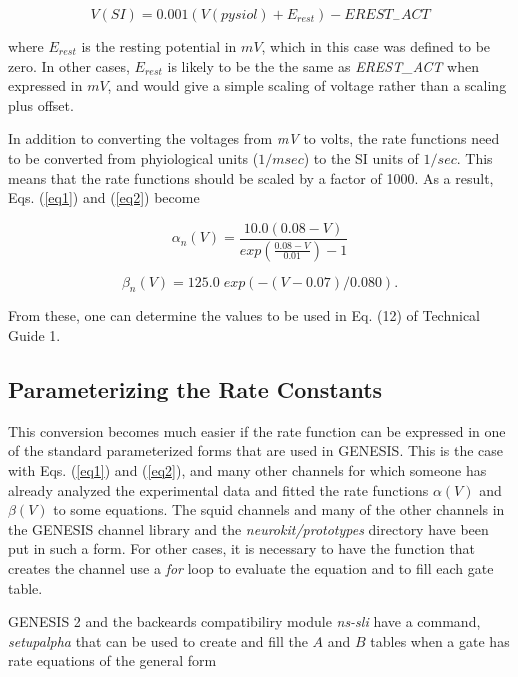 \documentclass[12pt]{article}
\begin{document}
\begin{equation}
V(SI) = 0.001 (V(pysiol) + E_{rest}) - EREST_{-}ACT
\label{eq6}
\end{equation}

where $E_{rest}$ is the resting potential in $mV$, which in this case
was defined to be zero.  In other cases, $E_{rest}$ is likely to be
the the same as {\em EREST\_ACT} when expressed in $mV$,  and would give a
simple scaling of voltage rather than a scaling plus offset.

In addition to converting the voltages from {\em mV\/} to volts, the rate
functions need to be converted from phyiological units ($1/msec$) to the SI
units of $1/sec$.  This means that the rate functions should be scaled by a
factor of 1000.  As a result, Eqs. (\ref{eq1}) and (\ref{eq2}) become

\begin{equation}
\alpha_n(V) = \frac{10.0 (0.08 - V)}{exp(\frac{0.08 - V}{0.01}) - 1}
\label{eq7}
\end{equation}

\begin{equation}
\beta_n(V) = 125.0\; exp(-(V - 0.07)/0.080).
\label{eq8}
\end{equation}
 
From these, one can determine the values to be used in Eq. (12) of
Technical Guide 1.

\subsection{Parameterizing the Rate Constants}
\label{sec4}

This conversion becomes much easier if the rate function can be expressed
in one of the standard parameterized forms that are used in GENESIS.  This
is the case with Eqs. (\ref{eq1}) and (\ref{eq2}), and many other channels
for which someone has already analyzed the experimental data and fitted the
rate functions $\alpha (V)$ and $\beta (V)$ to some equations.  The squid
channels and many of the other channels in the GENESIS channel library and
the {\em neurokit/prototypes\/} directory have been put in such a form.
For other cases, it is necessary to have the function that creates the
channel use a {\em for\/} loop to evaluate the equation and to fill each
gate table.

GENESIS 2 and the backeards compatibiliry module {\em ns-sli} have a
command, {\em setupalpha} that can be used to create and fill the $A$ and
$B$ tables when a gate has rate equations of the general form
\end{document}
